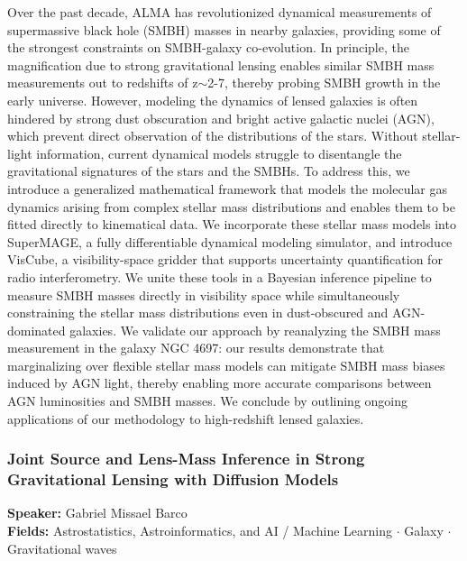 Over the past decade, ALMA has revolutionized dynamical measurements of supermassive black hole (SMBH) masses in nearby galaxies, providing some of the strongest constraints on SMBH-galaxy co-evolution. In principle, the magnification due to strong gravitational lensing enables similar SMBH mass measurements out to redshifts of z$\sim$2-7, thereby probing SMBH growth in the early universe. However, modeling the dynamics of lensed galaxies is often hindered by strong dust obscuration and bright active galactic nuclei (AGN), which prevent direct observation of the distributions of the stars. Without stellar-light information, current dynamical models struggle to disentangle the gravitational signatures of the stars and the SMBHs. To address this, we introduce a generalized mathematical framework that models the molecular gas dynamics arising from complex stellar mass distributions and enables them to be fitted directly to kinematical data. We incorporate these stellar mass models into SuperMAGE, a fully differentiable dynamical modeling simulator, and introduce VisCube, a visibility-space gridder that supports uncertainty quantification for radio interferometry. We unite these tools in a Bayesian inference pipeline to measure SMBH masses directly in visibility space while simultaneously constraining the stellar mass distributions even in dust-obscured and AGN-dominated galaxies. We validate our approach by reanalyzing the SMBH mass measurement in the galaxy NGC 4697: our results demonstrate that marginalizing over flexible stellar mass models can mitigate SMBH mass biases induced by AGN light, thereby enabling more accurate comparisons between AGN luminosities and SMBH masses. We conclude by outlining ongoing applications of our methodology to high-redshift lensed galaxies.

\hypertarget{abstract-talk-317}{}\label{abstract-page-talk-317}
\subsubsection*{Joint Source and Lens-Mass Inference in Strong Gravitational Lensing with Diffusion Models}
\textbf{Speaker:} Gabriel Missael Barco\\
\textbf{Fields:} Astrostatistics, Astroinformatics, and AI / Machine Learning $\cdot$ Galaxy $\cdot$ Gravitational waves

